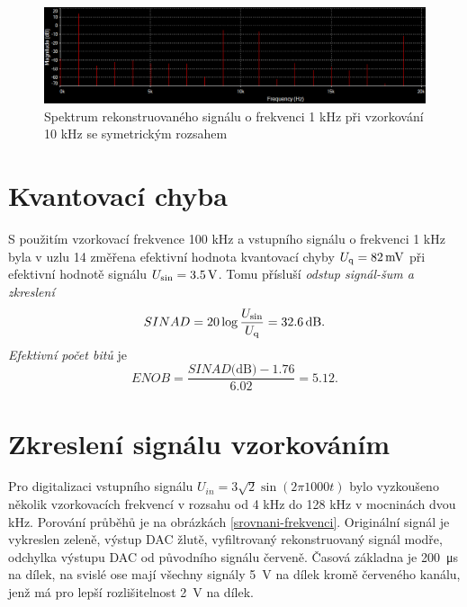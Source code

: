 \documentclass[twoside]{article}
\begin{document}
\begin{figure}[h]
    \includegraphics[width=\textwidth]{spektrum1-khz-sym.png}
    \caption{Spektrum rekonstruovaného signálu o frekvenci 1 kHz při vzorkování 10 kHz se symetrickým rozsahem}
    \label{spektrum-sym}
\end{figure}

\clearpage

\section{Kvantovací chyba}

S použitím vzorkovací frekvence 100 kHz a vstupního signálu o frekvenci 1 kHz
byla v uzlu 14 změřena efektivní hodnota
kvantovací chyby $U_{\rm q} = \SI{82}{\milli\volt}$ při efektivní hodnotě
signálu $U_{\rm sin} = \SI{3.5}{\volt}$. Tomu přísluší \textit{odstup signál-šum a zkreslení}
\begin{equation}
     SINAD = 20 \log \frac{U_{\rm sin}}{U_{\rm q}} = \SI{32.6}{\deci\bel}.
\end{equation}
\textit{Efektivní počet bitů} je
\begin{equation}
    ENOB = \frac{SINAD\text{(dB)} - 1.76}{6.02} = 5.12.
\end{equation}

\section{Zkreslení signálu vzorkováním}

Pro digitalizaci vstupního signálu $U_{in} = 3\sqrt{2} \sin \left(2\pi 1000 t\right)$ 
bylo vyzkoušeno
několik vzorkovacích frekvencí v rozsahu od 4 kHz do 128 kHz
v mocninách dvou kHz. Porování průběhů je na obrázkách \ref{srovnani-frekvenci}.
Originální signál je vykreslen zeleně, výstup DAC žlutě, vyfiltrovaný
rekonstruovaný signál modře, odchylka výstupu DAC od původního
signálu červeně. Časová základna je \SI{200}{\micro\second} na dílek,
na svislé ose mají všechny signály \SI{5}{\volt} na dílek
kromě červeného kanálu, jenž má pro lepší rozlišitelnost
 \SI{2}{\volt} na dílek.
\end{document}
